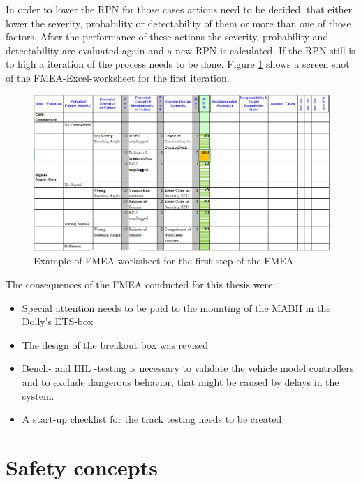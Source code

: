 \documentclass[ExampleMasters.tex]{subfiles}
\begin{document}
In order to lower the \gls{RPN} for those cases actions need to be decided, that either lower the severity, probability or detectability of them or more than one of those factors. After the performance of these actions the severity, probability and detectability are evaluated again and a new \gls{RPN} is calculated. If the \gls{RPN} still is to high a iteration of the process needs to be done. \cite{din_60812_fmea}
Figure \ref{fig:fmea_example} shows a screen shot of the FMEA-Excel-worksheet for the first iteration.    
\begin{figure}[h]
	\centering
	\includegraphics[width=1.0\linewidth]{figures/fmea_example}
	\caption[]{Example of \gls{FMEA}-worksheet for the first step of the FMEA}
	\label{fig:fmea_example}
\end{figure}
The consequences of the \gls{FMEA} conducted for this thesis were:
\begin{itemize}
	\item Special attention needs to be paid to the mounting of the \gls{MABII} in the Dolly's \gls{ETS}-box
	\item The design of the breakout box was revised
	\item Bench- and \gls{HIL} -testing is necessary to validate  the vehicle model controllers and to exclude dangerous behavior, that might be caused by delays in the system. 
	\item A start-up checklist for the track testing needs to be created	 
\end{itemize}  
\section{Safety concepts}
\label{sec:safetyconcepts}
\end{document}
